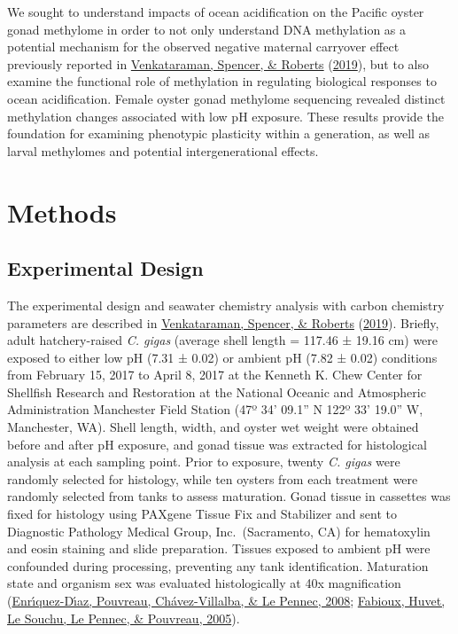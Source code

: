 \documentclass [11pt, proquest] {uwthesis}[2015/03/03]
\begin{document}
We sought to understand impacts of ocean acidification on the Pacific oyster gonad methylome in order to not only understand DNA methylation as a potential mechanism for the observed negative maternal carryover effect previously reported in \protect\hyperlink{ref-Venkataraman2019}{Venkataraman, Spencer, \& Roberts} (\protect\hyperlink{ref-Venkataraman2019}{2019}), but to also examine the functional role of methylation in regulating biological responses to ocean acidification. Female oyster gonad methylome sequencing revealed distinct methylation changes associated with low pH exposure. These results provide the foundation for examining phenotypic plasticity within a generation, as well as larval methylomes and potential intergenerational effects.

\hypertarget{methods-2}{%
\section{Methods}\label{methods-2}}

\hypertarget{experimental-design}{%
\subsection{Experimental Design}\label{experimental-design}}

The experimental design and seawater chemistry analysis with carbon chemistry parameters are described in \protect\hyperlink{ref-Venkataraman2019}{Venkataraman, Spencer, \& Roberts} (\protect\hyperlink{ref-Venkataraman2019}{2019}). Briefly, adult hatchery-raised \emph{C. gigas} (average shell length = 117.46 ± 19.16 cm) were exposed to either low pH (7.31 ± 0.02) or ambient pH (7.82 ± 0.02) conditions from February 15, 2017 to April 8, 2017 at the Kenneth K. Chew Center for Shellfish Research and Restoration at the National Oceanic and Atmospheric Administration Manchester Field Station (47º 34' 09.1'' N 122º 33' 19.0'' W, Manchester, WA). Shell length, width, and oyster wet weight were obtained before and after pH exposure, and gonad tissue was extracted for histological analysis at each sampling point. Prior to exposure, twenty \emph{C. gigas} were randomly selected for histology, while ten oysters from each treatment were randomly selected from tanks to assess maturation. Gonad tissue in cassettes was fixed for histology using PAXgene Tissue Fix and Stabilizer and sent to Diagnostic Pathology Medical Group, Inc.~(Sacramento, CA) for hematoxylin and eosin staining and slide preparation. Tissues exposed to ambient pH were confounded during processing, preventing any tank identification. Maturation state and organism sex was evaluated histologically at 40x magnification (\protect\hyperlink{ref-Enriquez-Diaz2008}{Enrı́quez-Dı́az, Pouvreau, Chávez-Villalba, \& Le Pennec, 2008}; \protect\hyperlink{ref-Fabioux2005}{Fabioux, Huvet, Le Souchu, Le Pennec, \& Pouvreau, 2005}).
\end{document}
